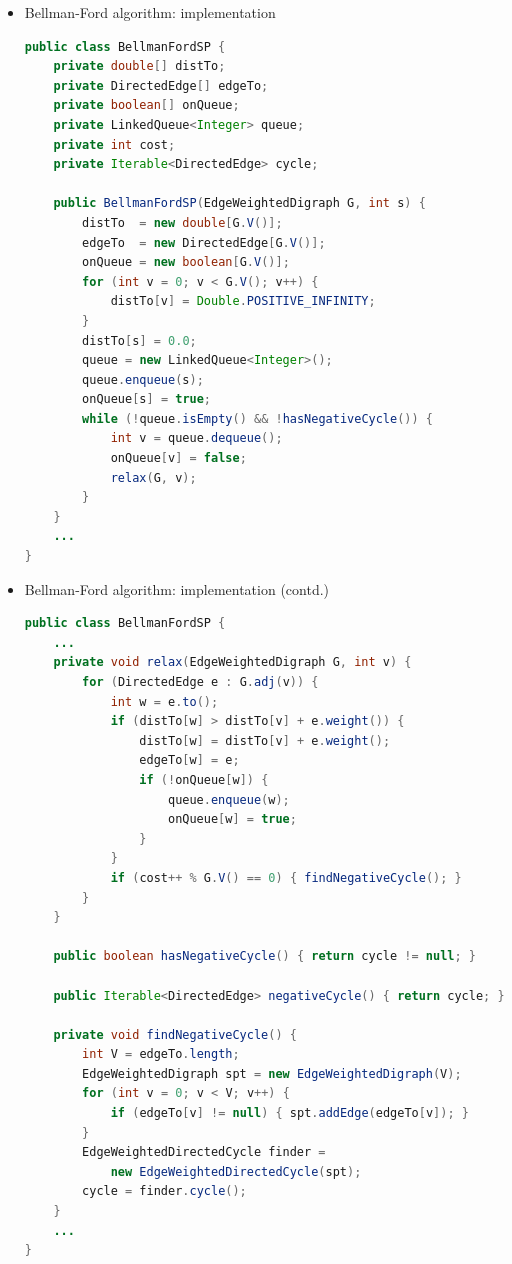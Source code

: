 \documentclass[8pt,a4paper,compress]{beamer}
\begin{document}
\begin{frame}[fragile]
\begin{itemize}
\item Bellman-Ford algorithm: implementation
\begin{lstlisting}[language=Java]
public class BellmanFordSP {
    private double[] distTo; 
    private DirectedEdge[] edgeTo; 
    private boolean[] onQueue; 
    private LinkedQueue<Integer> queue; 
    private int cost;
    private Iterable<DirectedEdge> cycle;  
    
    public BellmanFordSP(EdgeWeightedDigraph G, int s) {
        distTo  = new double[G.V()];
        edgeTo  = new DirectedEdge[G.V()];
        onQueue = new boolean[G.V()];
        for (int v = 0; v < G.V(); v++) {
            distTo[v] = Double.POSITIVE_INFINITY;
        }
        distTo[s] = 0.0;
        queue = new LinkedQueue<Integer>();
        queue.enqueue(s);
        onQueue[s] = true;
        while (!queue.isEmpty() && !hasNegativeCycle()) {
            int v = queue.dequeue();
            onQueue[v] = false;
            relax(G, v);
        }
    }
    ...
}
\end{lstlisting}
\end{itemize}
\end{frame}

\begin{frame}[fragile]
\begin{itemize}
\item Bellman-Ford algorithm: implementation (contd.)
\begin{lstlisting}[language=Java]
public class BellmanFordSP {
    ...  
    private void relax(EdgeWeightedDigraph G, int v) {
        for (DirectedEdge e : G.adj(v)) {
            int w = e.to();
            if (distTo[w] > distTo[v] + e.weight()) {
                distTo[w] = distTo[v] + e.weight();
                edgeTo[w] = e;
                if (!onQueue[w]) {
                    queue.enqueue(w);
                    onQueue[w] = true;
                }
            }
            if (cost++ % G.V() == 0) { findNegativeCycle(); }
        }
    }
    
    public boolean hasNegativeCycle() { return cycle != null; }

    public Iterable<DirectedEdge> negativeCycle() { return cycle; }
    
    private void findNegativeCycle() {
        int V = edgeTo.length;
        EdgeWeightedDigraph spt = new EdgeWeightedDigraph(V);
        for (int v = 0; v < V; v++) {
            if (edgeTo[v] != null) { spt.addEdge(edgeTo[v]); }
        }
        EdgeWeightedDirectedCycle finder = 
            new EdgeWeightedDirectedCycle(spt);
        cycle = finder.cycle();
    }
    ...
}
\end{lstlisting}
\end{itemize}
\end{frame}
\end{document}
